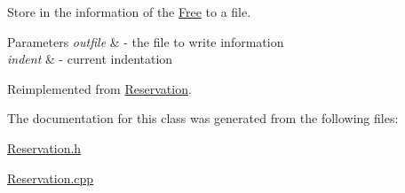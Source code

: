 Store in the information of the \mbox{\hyperlink{class_free}{Free}} to a file. 


\begin{DoxyParams}{Parameters}
{\em outfile} & -\/ the file to write information \\
\hline
{\em indent} & -\/ current indentation \\
\hline
\end{DoxyParams}


Reimplemented from \mbox{\hyperlink{class_reservation_a8ec83fe2eb15294c3a51a9998ed17df7}{Reservation}}.



The documentation for this class was generated from the following files\+:\begin{DoxyCompactItemize}
\item 
\mbox{\hyperlink{_reservation_8h}{Reservation.\+h}}\item 
\mbox{\hyperlink{_reservation_8cpp}{Reservation.\+cpp}}\end{DoxyCompactItemize}
